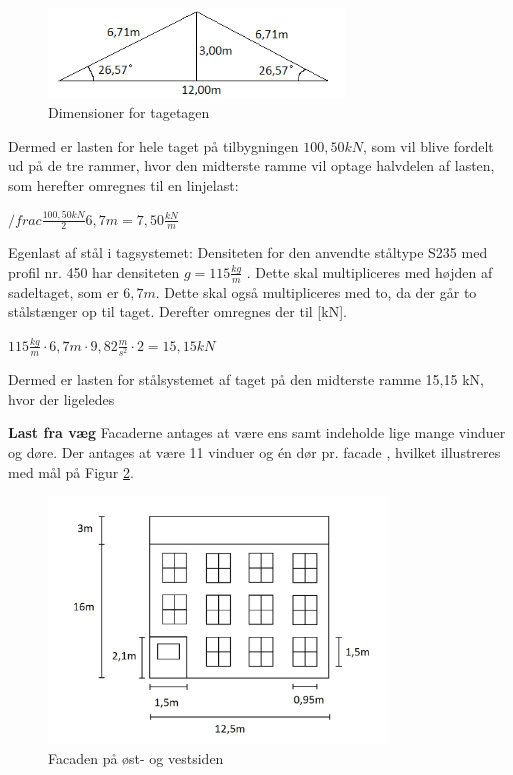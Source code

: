 \begin{figure}[H]
	\centering
	\includegraphics[width=0.7\textwidth]{billeder/Tagmedvinkel.png}
	\caption{Dimensioner for tagetagen}
	\label{fig:tagetage}
\end{figure}

Dermed er lasten for hele taget på tilbygningen $100,\!50 kN$, som vil blive fordelt ud på de tre rammer, hvor den midterste ramme vil optage halvdelen af lasten, som herefter omregnes til en linjelast:
\begin{center}
	$/frac{\frac{100,\!50 kN}{2}}{6,\!7 m} = 7,\!50 \frac{kN}{m}$
\end{center}

Egenlast af stål i tagsystemet:
\newline
Densiteten for den anvendte ståltype S235 med profil nr. 450 har densiteten $g = 115\frac{kg}{m}$ \citep{stabi}. Dette skal multipliceres med højden af sadeltaget, som er $6,\!7 m$. Dette skal også multipliceres med to, da der går to stålstænger op til taget. Derefter omregnes der til [kN].
\begin{center}
	$115\frac{kg}{m}\cdot 6,\!7m \cdot 9,\!82\frac{m}{s^2}\cdot 2 = 15,\!15 kN$
\end{center}

Dermed er lasten for stålsystemet af taget på den midterste ramme 15,15 kN, hvor der ligeledes 














\textbf{Last fra væg}
\newline
Facaderne antages at være ens samt indeholde lige mange vinduer og døre. Der antages at være 11 vinduer og én dør pr. facade \citep{gammellokalplan}, hvilket illustreres med mål på Figur \ref{fig:facade}.

\begin{figure}[H]
	\centering
	\includegraphics[width=0.8\textwidth]{billeder/facadenord.png}
	\caption{Facaden på øst- og vestsiden}
	\label{fig:facade}
\end{figure}

